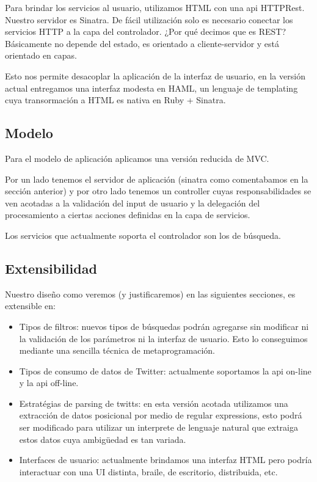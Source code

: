 Para brindar los servicios al usuario, utilizamos HTML con una api HTTPRest. Nuestro servidor es Sinatra. De f\'acil utilizaci\'on solo es necesario conectar los servicios HTTP a la capa del controlador. ¿Por qué decimos que es REST? B\'asicamente no depende del estado, es orientado a cliente-servidor y est\'a orientado en capas.

Esto nos permite desacoplar la aplicaci\'on de la interfaz de usuario, en la versi\'on actual entregamos una interfaz modesta en HAML, un lenguaje de templating cuya transormaci\'on a HTML es nativa en Ruby + Sinatra.

\subsection{Modelo}

Para el modelo de aplicaci\'on aplicamos una versi\'on reducida de MVC.

Por un lado tenemos el servidor de aplicaci\'on (sinatra como comentabamos en la secci\'on anterior) y por otro lado tenemos un controller cuyas responsabilidades se ven acotadas a la validaci\'on del input de usuario y la delegaci\'on del procesamiento a ciertas acciones definidas en la capa de servicios.

Los servicios que actualmente soporta el controlador son los de b\'usqueda.

\subsection{Extensibilidad}

Nuestro dise\~no como veremos (y justificaremos) en las siguientes secciones, es extensible en:

\begin{itemize}
    \item Tipos de filtros: nuevos tipos de b\'usquedas podr\'an agregarse sin modificar ni la validaci\'on de los par\'ametros ni la interfaz de usuario. Esto lo conseguimos mediante una sencilla t\'ecnica de metaprogramaci\'on.
    \item Tipos de consumo de datos de Twitter: actualmente soportamos la api on-line y la api off-line. 
    \item Estrat\'egias de parsing de twitts: en esta versi\'on acotada utilizamos una extracci\'on de datos posicional por medio de regular expressions, esto podr\'a ser modificado para utilizar un interprete de lenguaje natural que extraiga estos datos cuya ambig\"uedad es tan variada.
    \item Interfaces de usuario: actualmente brindamos una interfaz HTML pero podr\'ia interactuar con una UI distinta, braile, de escritorio, distribuida, etc.
\end{itemize}

